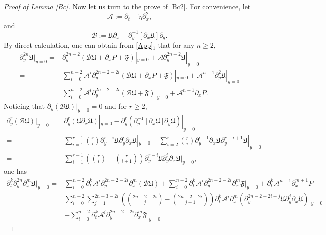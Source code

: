 \documentclass{amsart}
\numberwithin{equation}{section}
\begin{document}
\begin{proof}[Proof of Lemma \ref{Bc}]
Now let us turn to the prove of \eqref{Bc2}. For convenience, let
$$\mathcal{A}:=\partial_{t}-\tilde{\eta}\partial_{x}^{2},$$
and
$$\mathcal{B}:=\mathfrak{U}\partial_{x}+\partial_{y}^{-1}[\partial_{x}\mathfrak{U}]\partial_{y}.$$
By direct calculation, one can obtain from \eqref{App}$_{1}$ that for any $n\geq 2$,
\begin{align*}
\partial_{y}^{2n}\mathfrak{U}|_{y=0}
=& \partial_{y}^{2n-2}(\mathcal{B}\mathfrak{U}+\partial_{x}P+\mathfrak{F})|_{y=0}
  +\mathcal{A}\partial_{y}^{2n-2}\mathfrak{U}|_{y=0}\\
=& \sum_{i=0}^{n-2}\mathcal{A}^{i}\partial_{y}^{2n-2-2i}(\mathcal{B}\mathfrak{U}+\partial_{x}P+\mathfrak{F})|_{y=0}
  +\mathcal{A}^{n-1}\partial_{y}^{2}\mathfrak{U}|_{y=0}\\
=& \sum_{i=0}^{n-2}\mathcal{A}^{i}\partial_{y}^{2n-2-2i}(\mathcal{B}\mathfrak{U}+\mathfrak{F})|_{y=0}
  +\mathcal{A}^{n-1}\partial_{x}P.
\end{align*}
Noticing that
$\partial_{y}(\mathcal{B}\mathfrak{U})|_{y=0}=0$ and for $r\geq 2$,
\begin{align*}
\partial_{y}^{r}(\mathcal{B}\mathfrak{U})|_{y=0}
=& \partial_{y}^{r}(\mathfrak{U}\partial_{x}\mathfrak{U})|_{y=0}
  -\partial_{y}^{r}(\partial_{y}^{-1}[\partial_{x}\mathfrak{U}]\partial_{y}\mathfrak{U})|_{y=0}\\
=& \sum_{i=1}^{r-1}\binom{r}{i}\partial_{y}^{r-i}\mathfrak{U}\partial_{y}^{i}\partial_{x}\mathfrak{U}|_{y=0}
  -\sum_{i=2}^{r}\binom{r}{i}\partial_{y}^{i-1}\partial_{x}\mathfrak{U}\partial_{y}^{r-i+1}\mathfrak{U}|_{y=0}\\
=&\sum_{i=1}^{r-1}\left(\binom{r}{i}-\binom{r}{i+1}\right)\partial_{y}^{r-i}\mathfrak{U}\partial_{y}^{i}\partial_{x}\mathfrak{U}|_{y=0},
\end{align*}
one has
\begin{align}\label{Dknm}
\partial_{t}^{k}\partial_{y}^{2n}\partial_{x}^{m}\mathfrak{U}|_{y=0}
=& \sum_{i=0}^{n-2}\partial_{t}^{k}\mathcal{A}^{i}\partial_{y}^{2n-2-2i}\partial_{x}^{m}(\mathcal{B}\mathfrak{U})
  +\sum_{i=0}^{n-2}\partial_{t}^{k}\mathcal{A}^{i}\partial_{y}^{2n-2-2i}\partial_{x}^{m}\mathfrak{F}|_{y=0}
  +\partial_{t}^{k}\mathcal{A}^{n-1}\partial_{x}^{m+1}P\\
=& \sum_{i=0}^{n-2}\sum_{j=1}^{2n-3-2i}\left(\binom{2n-2-2i}{j}-\binom{2n-2-2i}{j+1}\right)
    \partial_{t}^{k}\mathcal{A}^{i}\partial_{x}^{m}(\partial_{y}^{2n-2-2i-j}\mathfrak{U}\partial_{y}^{j}\partial_{x}\mathfrak{U})|_{y=0}\nonumber\\
 &+\sum_{i=0}^{n-2}\partial_{t}^{k}\mathcal{A}^{i}\partial_{y}^{2n-2-2i}\partial_{x}^{m}\mathfrak{F}|_{y=0}

\end{align}
\end{proof}
\end{document}
